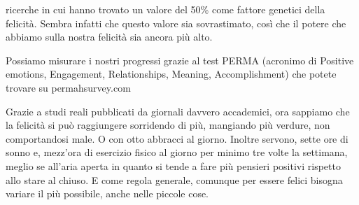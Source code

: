 \documentclass[12pt]{book} %
\begin{document}
ricerche in cui hanno trovato un valore del 50\% come fattore genetici della felicità. Sembra infatti che questo valore
sia sovrastimato, così che il potere che abbiamo sulla nostra felicità sia ancora più alto.

Possiamo misurare i nostri progressi grazie al test PERMA (acronimo di Positive emotions, Engagement, Relationships,
Meaning, Accomplishment) che potete trovare su permahsurvey.com 


\bigskip
\begin{mdframed}[linewidth=1pt]
Grazie a studi reali pubblicati da giornali davvero accademici, ora sappiamo che la felicità si può raggiungere
sorridendo di più, mangiando più
verdure, non comportandosi
male. O con otto abbracci al
giorno. Inoltre servono, sette ore di
sonno e, mezz'ora di esercizio fisico al giorno per minimo tre volte la settimana, meglio se
all'aria aperta in quanto si tende a fare più pensieri positivi rispetto allo stare al
chiuso. E come regola generale, comunque per essere
felici bisogna variare il più possibile, anche nelle piccole cose.


\bigskip


\end{mdframed}
\end{document}
